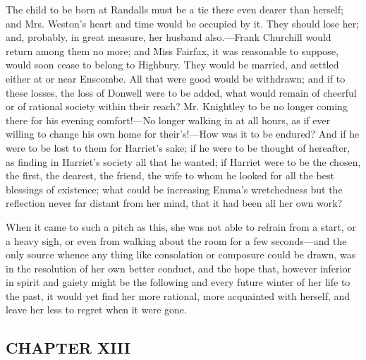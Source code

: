 The child to be born at Randalls must be a tie there even dearer than herself; and Mrs. Weston's heart and time would be occupied by it. They should lose her; and, probably, in great measure, her husband also.---Frank Churchill would return among them no more; and Miss Fairfax, it was reasonable to suppose, would soon cease to belong to Highbury. They would be married, and settled either at or near Enscombe. All that were good would be withdrawn; and if to these losses, the loss of Donwell were to be added, what would remain of cheerful or of rational society within their reach? Mr. Knightley to be no longer coming there for his evening comfort!---No longer walking in at all hours, as if ever willing to change his own home for their's!---How was it to be endured? And if he were to be lost to them for Harriet's sake; if he were to be thought of hereafter, as finding in Harriet's society all that he wanted; if Harriet were to be the chosen, the first, the dearest, the friend, the wife to whom he looked for all the best blessings of existence; what could be increasing Emma's wretchedness but the reflection never far distant from her mind, that it had been all her own work?

When it came to such a pitch as this, she was not able to refrain from a start, or a heavy sigh, or even from walking about the room for a few seconds---and the only source whence any thing like consolation or composure could be drawn, was in the resolution of her own better conduct, and the hope that, however inferior in spirit and gaiety might be the following and every future winter of her life to the past, it would yet find her more rational, more acquainted with herself, and leave her less to regret when it were gone.

\subsection[chapter-xiii-2]{\useURL[url51][][][]\from[url51]CHAPTER XIII}

